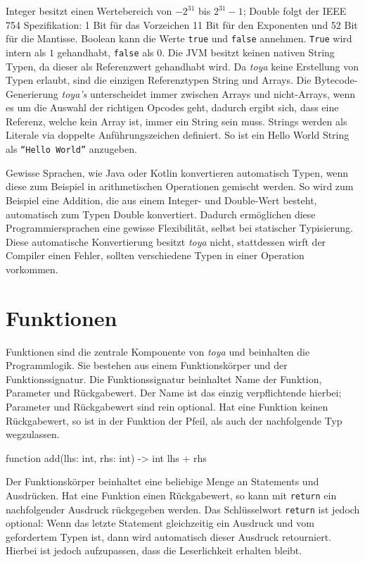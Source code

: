 Integer besitzt einen Wertebereich von $-2^{31}$ bis $2^{31} - 1$; Double folgt der IEEE 754 Spezifikation: 1 Bit für das Vorzeichen 11 Bit für den Exponenten und 52 Bit für die Mantisse. Boolean kann die Werte \texttt{true} und \texttt{false} annehmen. \texttt{True} wird intern als $1$ gehandhabt, \texttt{false} als 0. Die JVM besitzt keinen nativen String Typen, da dieser als Referenzwert gehandhabt wird. Da \textit{toya} keine Erstellung von Typen erlaubt, sind die einzigen Referenztypen String und Arrays. Die Bytecode-Generierung \textit{toya's} unterscheidet immer zwischen Arrays und nicht-Arrays, wenn es um die Auswahl der richtigen Opcodes geht, dadurch ergibt sich, dass eine Referenz, welche kein Array ist, immer ein String sein muss. Strings werden als Literale via doppelte Anführungszeichen definiert. So ist ein Hello World String als \texttt{``Hello World''} anzugeben.

Gewisse Sprachen, wie Java oder Kotlin konvertieren automatisch Typen, wenn diese zum Beispiel in arithmetischen Operationen gemischt werden. So wird zum Beispiel eine Addition, die aus einem Integer- und Double-Wert besteht, automatisch zum Typen Double konvertiert. Dadurch ermöglichen diese Programmiersprachen eine gewisse Flexibilität, selbst bei statischer Typisierung. Diese automatische Konvertierung besitzt \textit{toya} nicht, stattdessen wirft der Compiler einen Fehler, sollten verschiedene Typen in einer Operation vorkommen.

\section{Funktionen}

Funktionen sind die zentrale Komponente von \textit{toya} und beinhalten die Programmlogik.
Sie bestehen aus einem Funktionskörper und der Funktionssignatur. Die Funktionssignatur beinhaltet Name der Funktion, Parameter und Rückgabewert. Der Name ist das einzig verpflichtende hierbei; Parameter und Rückgabewert sind rein optional. Hat eine Funktion keinen Rückgabewert, so ist in der Funktion der Pfeil, als auch der nachfolgende Typ wegzulassen.

\begin{ToyaCode}[numbers=none, caption={Eine typische Funktion unter toya.}]
function add(lhs: int, rhs: int) -> int {
    lhs + rhs
}
\end{ToyaCode}

Der Funktionskörper beinhaltet eine beliebige Menge an Statements und Ausdrücken. Hat eine Funktion einen Rückgabewert, so kann mit \texttt{return} ein nachfolgender Ausdruck rückgegeben werden. Das Schlüsselwort \texttt{return} ist jedoch optional: Wenn das letzte Statement gleichzeitig ein Ausdruck und vom gefordertem Typen ist, dann wird automatisch dieser Ausdruck retourniert. Hierbei ist jedoch aufzupassen, dass die Leserlichkeit erhalten bleibt.

